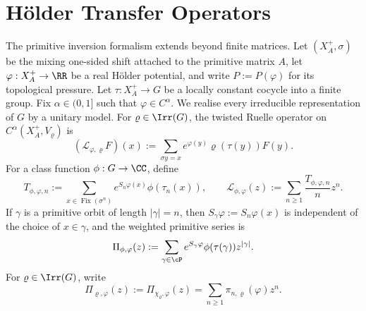 \section{H\"older Transfer Operators}
\label{sec:holder-transfer}

The primitive inversion formalism extends beyond finite matrices. Let
\((X_A^+,\sigma)\) be the mixing one-sided shift attached to the
primitive matrix \(A\), let \(\varphi:X_A^+\to\RR\) be a real
H\"older potential, and write \(P:=P(\varphi)\) for its topological
pressure. Let \(\tau:X_A^+\to G\) be a locally constant cocycle into a
finite group. Fix \(\alpha\in(0,1]\) such that
\(\varphi\in C^\alpha\). We realise every irreducible representation
of \(G\) by a unitary model. For \(\varrho\in\Irr(G)\), the twisted
Ruelle operator on \(C^\alpha(X_A^+,V_\varrho)\) is
\[
  (\mathscr L_{\varphi,\varrho}F)(x)
  :=
  \sum_{\sigma y=x}e^{\varphi(y)}\varrho(\tau(y))F(y).
\]
For a class function \(\phi:G\to\CC\), define
\[
  T_{\phi,\varphi,n}
  :=
  \sum_{x\in\operatorname{Fix}(\sigma^n)}
    e^{S_n\varphi(x)}\phi(\tau_n(x)),
  \qquad
  \mathcal L_{\phi,\varphi}(z)
  :=
  \sum_{n\ge 1}\frac{T_{\phi,\varphi,n}}{n}z^n.
\]
If \(\gamma\) is a primitive orbit of length \(|\gamma|=n\), then
\(S_\gamma\varphi:=S_n\varphi(x)\) is independent of the choice of
\(x\in\gamma\), and the weighted primitive series is
\[
  \Pi_{\phi,\varphi}(z)
  :=
  \sum_{\gamma\in\cP}
    e^{S_\gamma\varphi}\phi(\tau(\gamma))z^{|\gamma|}.
\]
For \(\varrho\in\Irr(G)\), write
\[
  \Pi_{\varrho,\varphi}(z):=\Pi_{\chi_\varrho,\varphi}(z)
  =\sum_{n\ge 1}\pi_{n,\varrho}(\varphi)z^n.
\]

